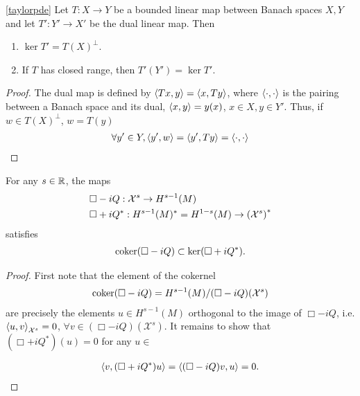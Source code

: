\documentclass[12pt]{article}
\begin{document}
\begin{flemma} \ref{taylorpde}
    Let $T: X \to Y$ be a bounded linear map between Banach spaces $X, Y$ and let $T' : Y' \to X'$ be the dual linear map. Then
    \begin{enumerate}
        \item $\ker T' = T(X)^\perp$. 
        \item If $T$ has closed range, then $T'(Y')  =\ker T'$.  
    \end{enumerate}
\end{flemma}
\begin{proof}
    The dual map is defined by $\inprod[Tx, y] = \inprod[x, Ty]$, where $\inprod $ is the pairing between a Banach space and its dual, $\inprod[x, y] = y(x)$, $x \in X, y \in Y'$. Thus, if $w \in T(X)^\perp$, $w = T(y)$
    \begin{align*}
    \forall y' \in Y, \inprod[y', w] = \inprod[y', Ty] = \inprod
    \end{align*}
    
\end{proof}


\begin{flemma}
    For any $s \in \R$, the maps 
    \begin{align*}
    &\Box - iQ : \mathcal{X}^s \to H^{s - 1}(M) \\
    &\Box + iQ^* : H^{s - 1}(M)^* = H^{1 -s}(M) \to \brac{\mathcal{X}^{s}}^*
    \end{align*}
    satisfies 
    \begin{align*}
    \coker (\Box - iQ) \subset \ker (\Box + iQ^*). 
    \end{align*}
\end{flemma}
\begin{proof}
    First note that the element of the cokernel
    \begin{align*}
    \coker (\Box - iQ) = H^{s -1}(M) / (\Box - iQ)(\mathcal{X}^s)
    \end{align*}
    are precisely the elements $u \in H^{s - 1}(M)$ orthogonal to the image of $\Box - iQ$, i.e. $\inprod[u, v]_{\mathcal{X}^s} = 0$, $\forall v \in (\Box - iQ)(\mathcal{X}^s)$. It remains to show that $(\Box + iQ^*)(u) = 0$ for any $u \in  $
    
    \begin{align*}
    \inprod[v, (\Box + iQ^*) u] = \inprod[(\Box - iQ)v, u] = 0. 
    \end{align*}
    
\end{proof}
\end{document}
